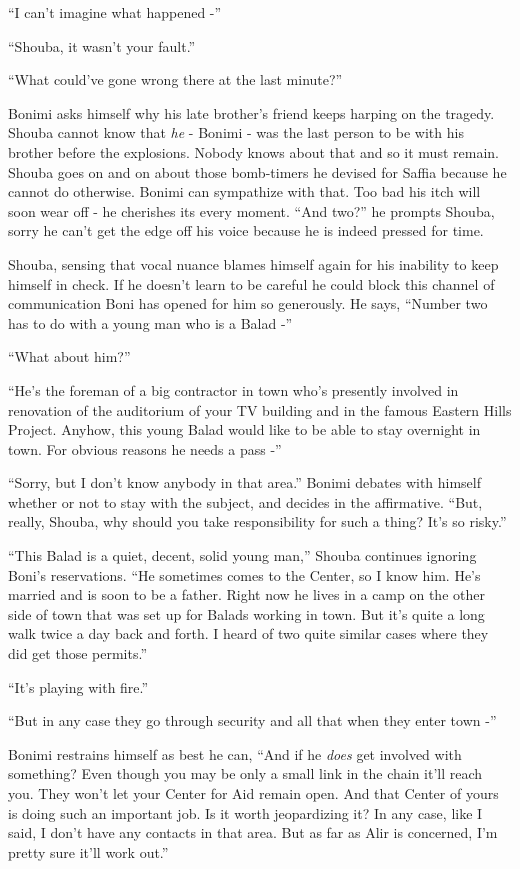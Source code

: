\documentclass[twoside,11pt]{book}
\begin{document}
``I can't imagine what happened -''

``Shouba, it wasn't your fault.''

``What could've gone wrong there at the last minute?''

Bonimi asks himself why his late brother's friend keeps harping on the tragedy. Shouba cannot know that \textit{he} -
Bonimi - was the last person to be with his brother before the explosions. Nobody knows about that and so it must
remain. Shouba  goes on and on about those bomb-timers he devised for Saffia because he cannot do otherwise. Bonimi can
sympathize with that. Too bad his itch will soon wear off - he cherishes its every moment.  ``And
two?'' he prompts Shouba, sorry he can't get the edge off his voice because he is indeed pressed for
time.

Shouba, sensing that vocal nuance blames himself again for his inability to keep himself in check. If he doesn't learn
to be careful he could block this channel of communication Boni has opened for him so generously. He says,
``Number two has to do with a young man who is a Balad -''

``What about him?''

``He's the foreman of a big contractor in town who's presently involved in renovation of the auditorium of
your TV building and in the famous Eastern Hills Project. Anyhow, this young Balad would like to be able to stay
overnight in town. For obvious reasons he needs a pass -''

``Sorry, but I don't know anybody in that area.'' Bonimi debates with himself whether or not
to stay with the subject, and decides in the affirmative. ``But, really, Shouba, why should you take
responsibility for such a thing? It's so risky.''

``This Balad is a quiet, decent, solid young man,'' Shouba continues ignoring Boni's
reservations. ``He sometimes comes to the Center, so I know him. He's married and is soon to be a father.
Right now he lives in a camp on the other side of town that was set up for Balads working in town. But it's quite a
long walk twice a day back and forth. I heard of two quite similar cases where they did get those
permits.''

``It's playing with fire.''

``But in any case they go through security and all that when they enter town -''

Bonimi restrains himself as best he can, ``And if he \textit{does} get involved with something? Even though
you may be only a small link in the chain it'll reach you. They won't let your Center for Aid remain open. And that
Center of yours is doing such an important job. Is it worth jeopardizing it? In any case, like I said, I don't have any
contacts in that area. But as far as Alir is concerned, I'm pretty sure it'll work out.''
\end{document}
